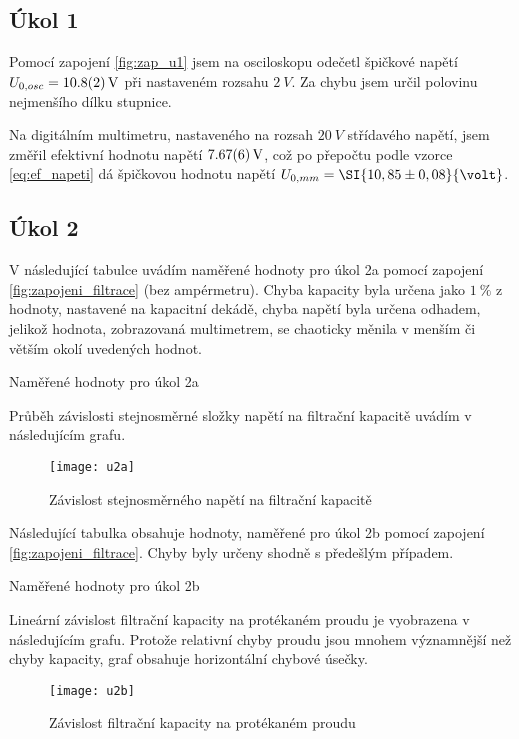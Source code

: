 \documentclass[0-protokol.tex]{subfiles}
\begin{document}
\subsection*{Úkol 1}
Pomocí zapojení \ref{fig:zap_u1} jsem na osciloskopu odečetl špičkové napětí $U_{0, osc} = \SI{10,8 \pm 0,2}{V}$ při nastaveném rozsahu $\SI{2}{V}$. Za chybu jsem určil polovinu nejmenšího dílku stupnice.

Na digitálním multimetru, nastaveného na rozsah $\SI{20}{V}$ střídavého napětí, jsem změřil efektivní hodnotu napětí $\SI{7,67 \pm 0,06}{V}$, což po přepočtu podle vzorce \eqref{eq:ef_napeti} dá špičkovou hodnotu napětí $U_{0, mm} = \SI{10,85 \pm 0,08}{\volt}$.

\subsection*{Úkol 2}
V následující tabulce uvádím naměřené hodnoty pro úkol 2a pomocí zapojení \ref{fig:zapojeni_filtrace} (bez ampérmetru). Chyba kapacity byla určena jako $\SI{1}{\percent}$ z hodnoty, nastavené na kapacitní dekádě, chyba napětí byla určena odhadem, jelikož hodnota, zobrazovaná multimetrem, se chaoticky měnila v menším či větším okolí uvedených hodnot.
\begin{table}[H] 
\centering
\setlength{\tabcolsep}{15pt}

\caption{Naměřené hodnoty pro úkol 2a}
\label{tab:u2a}
\end{table}

Průběh závislosti stejnosměrné složky napětí na filtrační kapacitě uvádím v následujícím grafu.
\begin{figure}[H]
\centering
\texttt{[image: u2a]}
\caption{Závislost stejnosměrného napětí na filtrační kapacitě}
\label{fig:u2a}
\end{figure}

Následující tabulka obsahuje hodnoty, naměřené pro úkol 2b pomocí zapojení \ref{fig:zapojeni_filtrace}. Chyby byly určeny shodně s předešlým případem.
\begin{table}[H] 
\centering
\setlength{\tabcolsep}{15pt}

\caption{Naměřené hodnoty pro úkol 2b}
\label{tab:u2b}
\end{table}

Lineární závislost filtrační kapacity na protékaném proudu je vyobrazena v následujícím grafu. Protože relativní chyby proudu jsou mnohem významnější než chyby kapacity, graf obsahuje horizontální chybové úsečky.
\begin{figure}[H]
\centering
\texttt{[image: u2b]}
\caption{Závislost filtrační kapacity na protékaném proudu}
\label{fig:u2b}
\end{figure}
\end{document}
